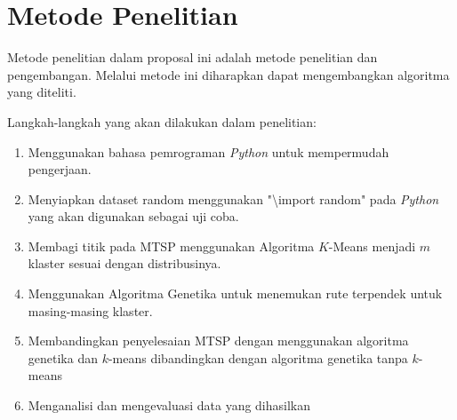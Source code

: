 \section{Metode Penelitian}

Metode penelitian dalam proposal ini adalah metode penelitian dan pengembangan. Melalui metode ini diharapkan dapat mengembangkan algoritma yang diteliti.

Langkah-langkah yang akan dilakukan dalam penelitian:
\begin{enumerate}
	\item Menggunakan bahasa pemrograman \textit{Python} untuk mempermudah pengerjaan.
	
	\item Menyiapkan dataset random menggunakan "\textbackslash import random" pada \textit{Python} yang akan digunakan sebagai uji coba.
	
	\item Membagi titik pada MTSP menggunakan Algoritma $K$-Means menjadi $m$ klaster sesuai dengan distribusinya.
	
	\item Menggunakan Algoritma Genetika untuk menemukan rute terpendek untuk masing-masing klaster.
	
	\item Membandingkan penyelesaian MTSP dengan menggunakan algoritma genetika dan $k$-means dibandingkan dengan algoritma genetika tanpa $k$-means
	
	\item Menganalisi dan mengevaluasi data yang dihasilkan

\end{enumerate}